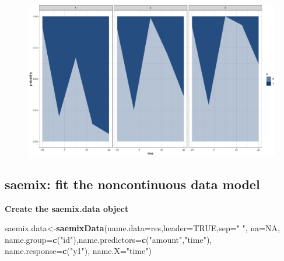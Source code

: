 \documentclass[]{book}
\newenvironment{Shaded}{\begin{snugshade}}{\end{snugshade}}
\newcommand{\KeywordTok}[1]{\textcolor[rgb]{0.13,0.29,0.53}{\textbf{{#1}}}}
\newcommand{\DataTypeTok}[1]{\textcolor[rgb]{0.13,0.29,0.53}{{#1}}}
\newcommand{\StringTok}[1]{\textcolor[rgb]{0.31,0.60,0.02}{{#1}}}
\newcommand{\OtherTok}[1]{\textcolor[rgb]{0.56,0.35,0.01}{{#1}}}
\newcommand{\NormalTok}[1]{{#1}}
\begin{document}
\begin{Shaded}
\end{Shaded}

\begin{figure}

{\centering \includegraphics[width=1\linewidth]{figures/prob_cat} 

}

\end{figure}

\subsection{saemix: fit the noncontinuous data
model}\label{saemix-fit-the-noncontinuous-data-model}

\textbf{Create the saemix.data object}

\begin{Shaded}
\begin{Highlighting}[]
\NormalTok{saemix.data<-}\KeywordTok{saemixData}\NormalTok{(}\DataTypeTok{name.data=}\NormalTok{res,}\DataTypeTok{header=}\OtherTok{TRUE}\NormalTok{,}\DataTypeTok{sep=}\StringTok{" "}\NormalTok{,}
  \DataTypeTok{na=}\OtherTok{NA}\NormalTok{, }\DataTypeTok{name.group=}\KeywordTok{c}\NormalTok{(}\StringTok{"id"}\NormalTok{),}\DataTypeTok{name.predictors=}\KeywordTok{c}\NormalTok{(}\StringTok{"amount"}\NormalTok{,}\StringTok{"time"}\NormalTok{),}
  \DataTypeTok{name.response=}\KeywordTok{c}\NormalTok{(}\StringTok{"y1"}\NormalTok{), }\DataTypeTok{name.X=}\StringTok{"time"}\NormalTok{)}
\end{Highlighting}
\end{Shaded}
\end{document}
